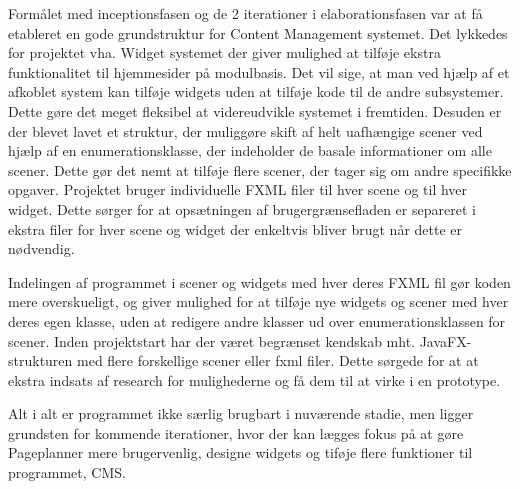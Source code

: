 \thispagestyle{fancy}

Formålet med inceptionsfasen og de 2 iterationer i elaborationsfasen var at få etableret en gode grundstruktur for Content Management systemet. Det lykkedes for projektet vha. Widget systemet der giver mulighed at tilføje ekstra funktionalitet til hjemmesider på modulbasis. Det vil sige, at man ved hjælp af et afkoblet system kan tilføje widgets uden at tilføje kode til de andre subsystemer. Dette gøre det meget fleksibel at videreudvikle systemet i fremtiden. Desuden er der blevet lavet et struktur, der muliggøre skift af helt uafhængige scener ved hjælp af en enumerationsklasse, der indeholder de basale informationer om alle scener. Dette gør det nemt at tilføje flere scener, der tager sig om andre specifikke opgaver.  Projektet bruger individuelle FXML filer til hver scene og til hver widget. Dette sørger for at opsætningen af brugergrænsefladen er separeret i ekstra filer for hver scene og widget der enkeltvis bliver brugt når dette er nødvendig. 

Indelingen af programmet i scener og widgets med hver deres FXML fil gør koden mere overskueligt, og giver mulighed for at tilføje nye widgets og scener med hver deres egen klasse, uden at redigere andre klasser ud over enumerationsklassen for scener. 
Inden projektstart har der været begrænset kendskab mht. JavaFX-strukturen med flere forskellige scener eller fxml filer. Dette sørgede for at at ekstra indsats af research for mulighederne og få dem til at virke i en prototype. 

Alt i alt er programmet ikke særlig brugbart i nuværende stadie, men ligger grundsten for kommende iterationer, hvor der kan lægges fokus på at gøre Pageplanner mere brugervenlig, designe widgets og tiføje flere funktioner til programmet, CMS.







